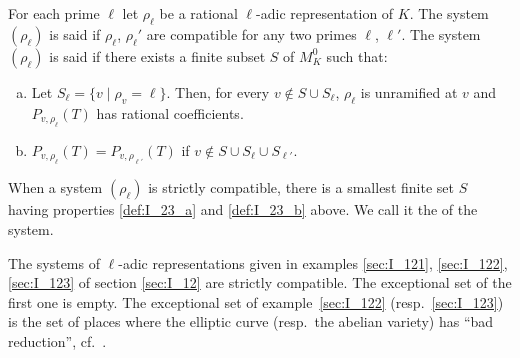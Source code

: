 \begin{mydef}
For each prime $\ell$ let $\rho_\ell$ be a rational $\ell$-adic representation
of $K$.
The system $(\rho_\ell)$ is said  if $\rho_\ell$, $\rho_\ell'$ are compatible for any
two primes $\ell$, $\ell'$. The system $(\rho_\ell)$ is said  if
there exists a finite subset $S$ of $M_K^0$ such that:
\begin{enumerate}[(a)]
\item\label{def:I_23_a}
	Let $S_\ell = \{ v \mid \rho_v = \ell \}$. Then, for every $v \not\in S
	\cup S_\ell$, $\rho_\ell$ is unramified at $v$ and $P_{v,\rho_\ell}(T)$
	has rational coefficients.
\item\label{def:I_23_b}
	$P_{v,\rho_\ell}(T) = P_{v,\rho_{\ell'}}(T)$ if $v \not\in S \cup S_\ell \cup S_{\ell'}$.
\end{enumerate}
\dpage
When a system $(\rho_\ell)$ is strictly compatible, there is a smallest finite
set $S$ having properties \ref{def:I_23_a} and \ref{def:I_23_b} above.
We call it the  of the system.
\end{mydef}

\begin{ex}
The systems of $\ell$-adic representations given in examples \ref{sec:I_121},
\ref{sec:I_122}, \ref{sec:I_123} of section \ref{sec:I_12} are strictly
compatible. The exceptional set of the first one is empty. The exceptional set
of example~\ref{sec:I_122} (resp.\ \ref{sec:I_123}) is the set of
places where the elliptic curve (resp.\ the abelian variety) has ``bad
reduction'', cf.\ \cite{32}.
\end{ex}

